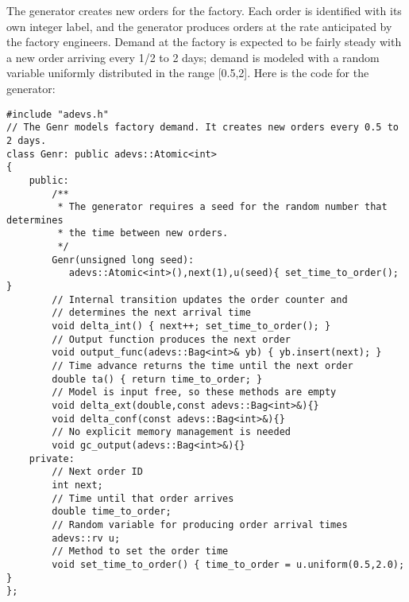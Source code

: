 The generator creates new orders for the factory. Each order is identified with its own integer label, and the generator produces orders at the rate anticipated by the factory engineers. Demand at the factory is expected to be fairly steady with a new order arriving every 1/2 to 2 days; demand is modeled with a random variable uniformly distributed in the range [0.5,2]. Here is the code for the generator:
\begin{verbatim}
#include "adevs.h"
// The Genr models factory demand. It creates new orders every 0.5 to 2 days.
class Genr: public adevs::Atomic<int>
{
    public:
        /**
         * The generator requires a seed for the random number that determines
         * the time between new orders.
         */
        Genr(unsigned long seed):
           adevs::Atomic<int>(),next(1),u(seed){ set_time_to_order(); }
        // Internal transition updates the order counter and
		// determines the next arrival time
        void delta_int() { next++; set_time_to_order(); }
        // Output function produces the next order
        void output_func(adevs::Bag<int>& yb) { yb.insert(next); }
        // Time advance returns the time until the next order
        double ta() { return time_to_order; }
        // Model is input free, so these methods are empty
        void delta_ext(double,const adevs::Bag<int>&){}
        void delta_conf(const adevs::Bag<int>&){}
        // No explicit memory management is needed
        void gc_output(adevs::Bag<int>&){}
    private:
        // Next order ID
        int next;
        // Time until that order arrives
        double time_to_order;
        // Random variable for producing order arrival times
        adevs::rv u;
        // Method to set the order time
        void set_time_to_order() { time_to_order = u.uniform(0.5,2.0); }
};
\end{verbatim} 

